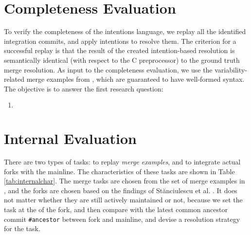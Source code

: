 \section{Completeness Evaluation}
To verify the completeness of the intentions language, we replay all the identified integration commits, and apply intentions to resolve them. The criterion for a successful replay is that the result of the created intention-based resolution is semantically identical (with respect to the C preprocessor) to the ground truth merge resolution. As input to the completeness evaluation, we use the variability-related merge examples from \marlin, which are guaranteed to have well-formed syntax. 
The objective is to answer the first research question:
\begin{enumerate}[label={Q\arabic*}]
    \setcounter{enumi}{0}
    \item \RQA
\end{enumerate}

\section{Internal Evaluation} \label{m:internal}
 There are two types of tasks: to replay \textit{merge examples}, and to integrate actual forks with the mainline. The characteristics of these tasks are shown in Table \ref{tab:internalchar}.  The merge tasks are chosen from the set of merge examples in \marlin, and the forks are chosen based on the findings of St\u{a}nciulescu et al. \cite{stanciulescu2015}. It does not matter whether they are still actively maintained or not, because we set the task at the \head of the fork, and then compare with the latest common ancestor commit \texttt{\#ancestor} between fork and mainline, and devise a resolution strategy for the task.

